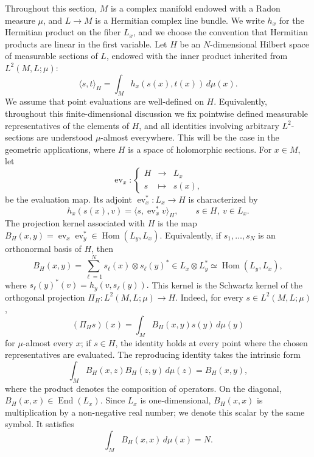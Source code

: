 \documentclass[12pt,a4paper,reqno]{article}
\theoremstyle{thmstyleone}
\theoremstyle{thmstylethree}
\theoremstyle{thmstyletwo}
\numberwithin{equation}{subsection}
\begin{document}
Throughout this section, $M$ is a complex manifold endowed with a Radon measure $\mu$, and $L\to M$ is a Hermitian complex line bundle. We write $h_x$ for the Hermitian product on the fiber $L_x$, and we choose the convention that Hermitian products are linear in the first variable. Let $H$ be an $N$-dimensional Hilbert space of measurable sections of $L$, endowed with the inner product inherited from $L^2(M,L;\mu)$:
\[
    \langle s,t\rangle_H
    =
    \int_M h_x(s(x),t(x))\,d\mu(x).
\]
We assume that point evaluations are well-defined on $H$. Equivalently, throughout this finite-dimensional discussion we fix pointwise defined measurable representatives of the elements of $H$, and all identities involving arbitrary $L^2$-sections are understood $\mu$-almost everywhere. This will be the case in the geometric applications, where $H$ is a space of holomorphic sections. For $x\in M$, let
\[
    \operatorname{ev}_x:\left\lbrace\begin{array}{ccc}
    H & \longrightarrow & L_x\\
    s & \longmapsto & s(x),
    \end{array}\right.    
\]
be the evaluation map. Its adjoint $\operatorname{ev}_x^*:L_x\longrightarrow H$ is characterized by
\[
    h_x(s(x),v)
    =
    \langle s,\operatorname{ev}_x^*v\rangle_H,
    \qquad s\in H,\ v\in L_x.
\]
The projection kernel associated with $H$ is the map $B_H(x,y)=\operatorname{ev}_x\operatorname{ev}_y^*\in \operatorname{Hom}(L_y,L_x).$ Equivalently, if $s_1,\ldots,s_N$ is an orthonormal basis of $H$, then
\[
    B_H(x,y)
    =
    \sum_{\ell=1}^N s_\ell(x)\otimes s_\ell(y)^*
    \in L_x\otimes L_y^*
    \simeq \operatorname{Hom}(L_y,L_x),
\]
where $s_\ell(y)^*(v)=h_y(v,s_\ell(y)).$ This kernel is the Schwartz kernel of the orthogonal projection $\Pi_H:L^2(M,L;\mu)\longrightarrow H.$ Indeed, for every $s\in L^2(M,L;\mu)$,
\[
(\Pi_Hs)(x)=\int_M B_H(x,y)s(y)\,d\mu(y)
\]
for $\mu$-almost every $x$; if $s\in H$, the identity holds at every point where the chosen representatives are evaluated. The reproducing identity takes the intrinsic form
\[
    \int_M B_H(x,z)B_H(z,y)\,d\mu(z)
    =
    B_H(x,y),
\]
where the product denotes the composition of operators. On the diagonal, $B_H(x,x)\in \operatorname{End}(L_x)$. Since $L_x$ is one-dimensional, $B_H(x,x)$ is multiplication by a non-negative real number; we denote this scalar by the same symbol. It satisfies
\[
    \int_M B_H(x,x)\,d\mu(x)=N.
\]
\end{document}
